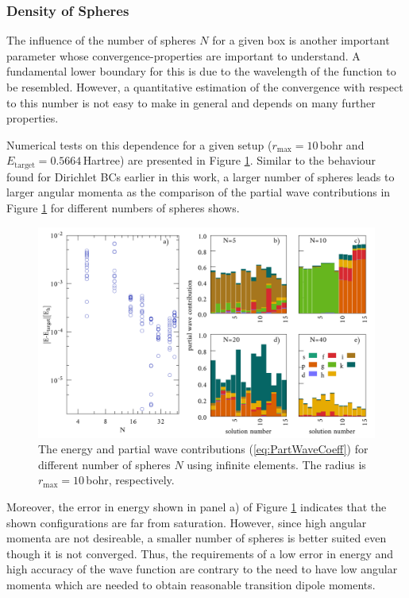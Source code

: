 \subsubsection{Density of Spheres}
\label{sec:BenchSphere}
The influence of the number of spheres $N$ for a given box is another important parameter whose convergence-properties are important to understand.
A fundamental lower boundary for this is due to the wavelength of the function to be resembled.
However, a quantitative estimation of the convergence with respect to this number is not easy to make in general and depends on many further properties.

Numerical tests on this dependence for a given setup ($r_\text{max}=10\,$bohr and $E_\text{target}=0.5664\,$Hartree) are presented in Figure \ref{fig:InfNum}.
Similar to the behaviour found for Dirichlet BCs earlier in this work, a larger number of spheres leads to larger angular momenta as the comparison of the partial wave contributions in Figure \ref{fig:InfNum} for different numbers of spheres shows.

\begin{figure}[h]
\includegraphics[width=\textwidth]{Figures/BC/NumInfEL}
\caption{The energy and partial wave contributions (\ref{eq:PartWaveCoeff}) for different number of spheres $N$ using infinite elements. The radius is $r_\text{max}=10\,$bohr, respectively.}
\label{fig:InfNum}
\end{figure}
Moreover, the error in energy shown in panel a) of Figure \ref{fig:InfNum} indicates that the shown configurations are far from saturation.
However, since high angular momenta are not desireable, a smaller number of spheres is better suited even though it is not converged.
Thus, the requirements of a low error in energy and high accuracy of the wave function are contrary to the need to have low angular momenta which are needed to obtain reasonable transition dipole moments.

